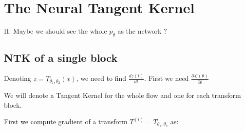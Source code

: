 \documentclass[11pt, a4paper]{article}
\theoremstyle{definition}
\theoremstyle{remark}
\newcommand{\E}{\mathbb{E}}
\newcommand{\empnorm}[1]{\|#1\|_{\mu_n}}
\newcommand{\inner}[2]{\langle #1 , #2 \rangle }
\begin{document}
%	
%	
	

	
	\section{The Neural Tangent Kernel}
	
	 H: Maybe we should see the whole \(p_\theta\) as the network ?\\
	 
	 
	 \subsection{NTK of a single block}
	 
	 Denoting \(z = T_{\theta_1,\theta_2}(x)\), we need to find \(\frac{d z(t)}{dt}\). First we need \(\frac{\partial \mathcal{L(\theta)}}{\partial \theta}\)
	 
	 
	 
	 We will denote a Tangent Kernel for the whole flow and one for each transform block.
	 
	
	First we compute gradient of a transform \(T^{(i)}=T_{\theta_1,\theta_2}\) as:
	
\end{document}
